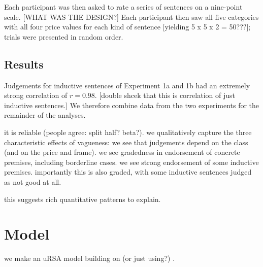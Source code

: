 \documentclass[11pt]{amsart}
\newcommand{\ndg}[1]{{\color{ForestGreen}[#1]}}
\begin{document}
Each participant was then asked to rate a series of sentences on a nine-point scale.
\ndg{WHAT WAS THE DESIGN?}
Each participant then saw all five categories with all four price values for each kind of sentence \ndg{yielding 5 x 5 x 2 = 50???}; trials were presented in random order.



\subsection{Results}


Judgements for inductive sentences of Experiment 1a and 1b had an extremely strong correlation of $r=0.98$. \ndg{double shcek that this is correlation of just inductive sentences.} We therefore combine data from the two experiments for the remainder of the analyses.

it is reliable (people agree: split half? beta?).
we qualitatively capture the three characteristic effects of vagueness:
  we see that judgements depend on the class (and on the price and frame).
  we see gradedness in endorsement of concrete premises, including borderline cases.
  we see strong endorsement of some inductive premises. importantly this is also graded, with some inductive sentences judged as not good at all.
  
this suggests rich quantitative patterns to explain.


\section{Model}
\label{model}

we make an uRSA model building on (or just using?) \cite{lassiter2015}.
\end{document}

